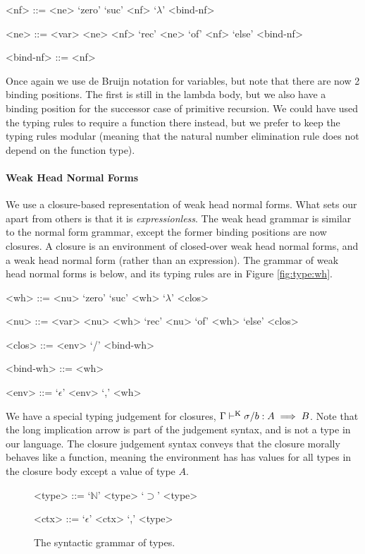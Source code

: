 \documentclass[preprint,authoryear]{sigplanconf}
\def\turnstyle{\vdash}
\def\asc{:}
\def\arr{\supset}
\def\nat{\mathbb{N}}
\def\emp{\epsilon}
\newcommand{\con}[1]{\textmd{#1}}
\newcommand{\turn}[1]{\turnstyle^\con{#1}}
\newcommand{\typk}[3]{\Gamma \turn{K}  #1 \asc #2 \implies #3}
\newcommand{\reffig}[1]{Figure \ref{fig:#1}}
\begin{document}
\begin{grammar}
<nf> ::= <ne> 
\alt `zero'
\alt `suc' <nf>
\alt `\(\lambda\)' <bind-nf>

<ne> ::= <var> 
\alt <ne> <nf>
\alt `rec' <ne> `of' <nf> `else' <bind-nf>

<bind-nf> ::= <nf> 
\end{grammar}

Once again we use de Bruijn notation for variables, but note that
there are now 2 binding positions. The first is still in the lambda
body, but we also have a binding position for the successor case of
primitive recursion. We could have used the typing rules to require a
function there instead, but we prefer to keep the typing rules
modular (meaning that the natural number elimination rule does not
depend on the function type).

\paragraph{Weak Head Normal Forms}

We use a closure-based representation of weak head normal forms. What
sets our apart from others is that it is {\it expressionless}. The
weak head grammar is similar to the normal form grammar, except
the former binding positions are now closures. A closure is an environment of
closed-over weak head normal forms, and a weak head normal form
(rather than an expression). The grammar of weak head normal forms is below, and
its typing rules are in \reffig{type:wh}.

\begin{grammar}
<wh> ::= <nu> 
\alt `zero'
\alt `suc' <wh>
\alt `\(\lambda\)' <clos>

<nu> ::= <var> 
\alt <nu> <wh>
\alt `rec' <nu> `of' <wh> `else' <clos>

<clos> ::= <env> `/' <bind-wh>

<bind-wh> ::= <wh> 

<env> ::= `\(\emp\)'
\alt <env> `,' <wh>
\end{grammar}

We have a special typing judgement for closures,
$\typk{\sigma / b}{A}{B}$. Note that the long implication arrow is
part of the judgement syntax, and is not a type in our language. The
closure judgement syntax conveys that the closure morally
behaves like a function, meaning the environment has has values for
all types in the closure body except a value of type $A$.


\begin{figure}[t!]
\caption{
The syntactic grammar of types.
}
\begin{grammar}
<type> ::= `\(\nat\)'
\alt <type> `\(\arr\)' <type>

<ctx> ::= `\(\emp\)'
\alt <ctx> `,' <type>
\end{grammar}
\label{fig:gram:type}
\end{figure}
\end{document}
